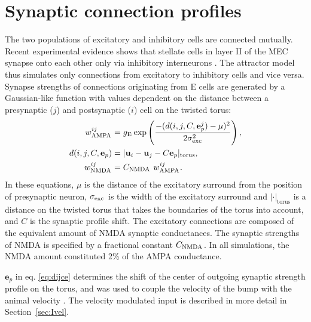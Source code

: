 \documentclass[a4paper,12pt]{article}
\newcommand{\ssc}[3]{\ensuremath{#1_{\text{#2}_{\text{#3}}}}}
\newcommand{\wAMPA   }{\ssc{w}      {\scriptsize{AMPA}}{}}
\newcommand{\wNMDA   }{\ssc{w}      {\scriptsize{NMDA}}{}}
\newcommand{\cNMDA   }{\ssc{C}      {\scriptsize{NMDA}}{}}
\newcommand{\sigmasub}[1]{\ssc{\sigma}{\scriptsize{#1}}{}}
\newcommand{\gE      }{\ssc{g}      {\scriptsize{E}}{}}
\newcommand{\dijce}{\ensuremath{d(i, j, C, \mathbf{e}_p^j)}}
\begin{document}


\section{Synaptic connection profiles} \label{conn_profiles}

The two populations of excitatory and inhibitory cells are connected mutually.
Recent experimental evidence shows that stellate cells in layer II of the MEC
synapse onto each other only via inhibitory interneurons
\citep{Dhillon:2000ww,Pastoll:2013ff,Couey:2013fi}. The attractor model thus
simulates only connections from excitatory to inhibitory cells and vice versa.
Synapse strengths of connections originating from E cells are generated by
a Gaussian-like function with values dependent on the distance between a
presynaptic ($j$) and postsynaptic ($i$) cell on the twisted torus:
\begin{align}
    \wAMPA^{ij} &= \gE \exp\left(
                   \frac{-(\dijce - \mu)^2}{2 \sigmasub{exc}^2}
                   \right), \label{eq:wAMPA} \\
    d(i, j, C, \mathbf{e}_p)  &= | \mathbf{u}_i - \mathbf{u}_j -
            C  \mathbf{e}_p |_{\mathrm{torus}}, \label{eq:dijce} \\
    \wNMDA^{ij} &= \cNMDA\ \wAMPA^{ij}. \label{eq:wNMDA}
\end{align}
In these equations, $\mu$ is the distance of the excitatory surround from the
position of presynaptic neuron, $\sigmasub{exc}$ is the width of the excitatory
surround and $|\cdot|_{\mathrm{torus}}$ is a distance on the twisted torus that
takes the boundaries of the torus into account, and $C$ is the
synaptic profile shift. The excitatory connections are
composed of the equivalent amount of NMDA synaptic conductances. The synaptic
strengths of NMDA is specified by a fractional constant \cNMDA. In all
simulations, the NMDA amount constituted 2\% of the AMPA conductance.

$\mathbf{e}_p$ in eq. \eqref{eq:dijce} determines the shift of the center of
outgoing synaptic strength profile on the torus, and was used to couple the
velocity of the bump with the animal velocity
\citep{Burak:2009fx,Pastoll:2013ff}. The velocity modulated input is described
in more detail in Section~\ref{sec:Ivel}.
\end{document}
